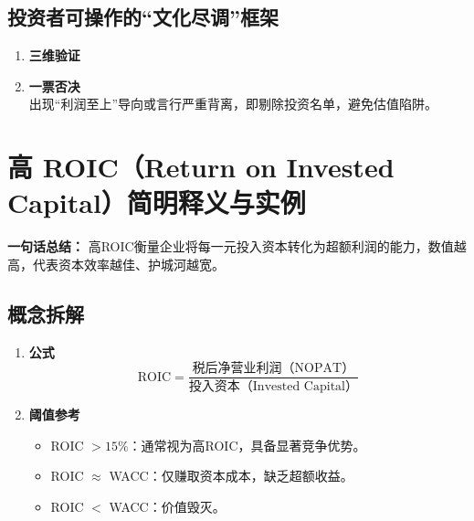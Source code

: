 \subsection{投资者可操作的“文化尽调”框架}
\begin{enumerate}[leftmargin=*, nosep]
    \item \textbf{三维验证}  
    \item \textbf{一票否决}  \\
    出现“利润至上”导向或言行严重背离，即剔除投资名单，避免估值陷阱。
\end{enumerate}

\section{高 ROIC（Return on Invested Capital）简明释义与实例}
\textbf{一句话总结：}  
高ROIC衡量企业将每一元投入资本转化为超额利润的能力，数值越高，代表资本效率越佳、护城河越宽。

\subsection{概念拆解}
\begin{enumerate}[leftmargin=*, nosep]
    \item \textbf{公式}  
    \[
    \text{ROIC} = \frac{\text{税后净营业利润（NOPAT）}}{\text{投入资本（Invested Capital）}}
    \]
    \item \textbf{阈值参考}  
    \begin{itemize}[nosep]
        \item ROIC $>15\%$：通常视为高ROIC，具备显著竞争优势。  
        \item ROIC $\approx$ WACC：仅赚取资本成本，缺乏超额收益。  
        \item ROIC $<$ WACC：价值毁灭。
    \end{itemize}
\end{enumerate}

